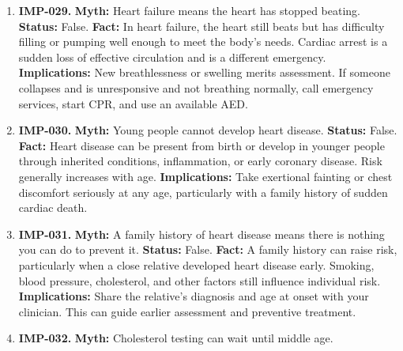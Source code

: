 \documentclass[11pt,oneside]{book}
\begin{document}
\begin{enumerate}[leftmargin=0pt,labelwidth=0pt,labelsep=0pt,itemindent=0pt]
\textbf{Status:} False.\newline
\textbf{Fact:} Heel pain can arise from the plantar fascia, Achilles tendon, heel pad, or a bone stress injury. The location and timing of pain help distinguish the possibilities. \cite{ref409}\newline
\textbf{Implications:} Seek assessment for persistent pain or pain after a significant injury, especially if you cannot bear weight.
\item[] \textbf{IMP-029.} \textbf{Myth:} Heart failure means the heart has stopped beating.\newline
\textbf{Status:} False.\newline
\textbf{Fact:} In heart failure, the heart still beats but has difficulty filling or pumping well enough to meet the body's needs. Cardiac arrest is a sudden loss of effective circulation and is a different emergency. \cite{ref46}\newline
\textbf{Implications:} New breathlessness or swelling merits assessment. If someone collapses and is unresponsive and not breathing normally, call emergency services, start CPR, and use an available AED.
\item[] \textbf{IMP-030.} \textbf{Myth:} Young people cannot develop heart disease.\newline
\textbf{Status:} False.\newline
\textbf{Fact:} Heart disease can be present from birth or develop in younger people through inherited conditions, inflammation, or early coronary disease. Risk generally increases with age. \cite{ref46}\newline
\textbf{Implications:} Take exertional fainting or chest discomfort seriously at any age, particularly with a family history of sudden cardiac death.
\item[] \textbf{IMP-031.} \textbf{Myth:} A family history of heart disease means there is nothing you can do to prevent it.\newline
\textbf{Status:} False.\newline
\textbf{Fact:} A family history can raise risk, particularly when a close relative developed heart disease early. Smoking, blood pressure, cholesterol, and other factors still influence individual risk. \cite{ref46}\newline
\textbf{Implications:} Share the relative's diagnosis and age at onset with your clinician. This can guide earlier assessment and preventive treatment.
\item[] \textbf{IMP-032.} \textbf{Myth:} Cholesterol testing can wait until middle age.\newline

\end{enumerate}
\end{document}
